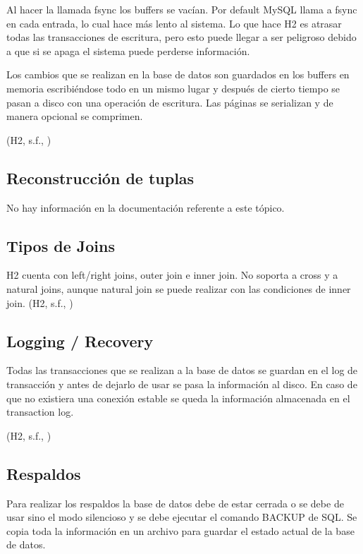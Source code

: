 \documentclass{acmart}
\begin{document}
Al hacer la llamada fsync los buffers se vacían. Por default MySQL llama a fsync en cada entrada, lo cual hace más lento al sistema. Lo que hace H2 es atrasar todas las transacciones de escritura, pero esto puede llegar a ser peligroso debido a que si se apaga el sistema puede perderse información. 



Los cambios que se realizan en la base de datos son guardados en los buffers en memoria escribiéndose todo en un mismo lugar y después de cierto tiempo se pasan a disco con una operación de escritura. Las páginas se serializan y de manera opcional se comprimen. 

(H2, s.f., \cite{h2mvstore})

\subsection{Reconstrucción de tuplas}

No hay información en la documentación referente a este tópico.



\subsection{Tipos de Joins}

H2 cuenta con left/right joins, outer join e inner join. No soporta a cross y a natural joins, aunque natural join se puede realizar con las condiciones de inner join. 
(H2, s.f., \cite{h2grammar})

\subsection{Logging / Recovery}

Todas las transacciones que se realizan a la base de datos se guardan en el log de transacción y antes de dejarlo de usar se pasa la información al disco. En caso de que no existiera una conexión estable se queda la información almacenada en el transaction log. 

(H2, s.f., \cite{h2advanced})

\subsection{Respaldos}

Para realizar los respaldos la base de datos debe de estar cerrada o se debe de usar sino el modo silencioso y se debe ejecutar el comando BACKUP de SQL. Se copia toda la información en un archivo para guardar el estado actual de la base de datos.  
\end{document}
